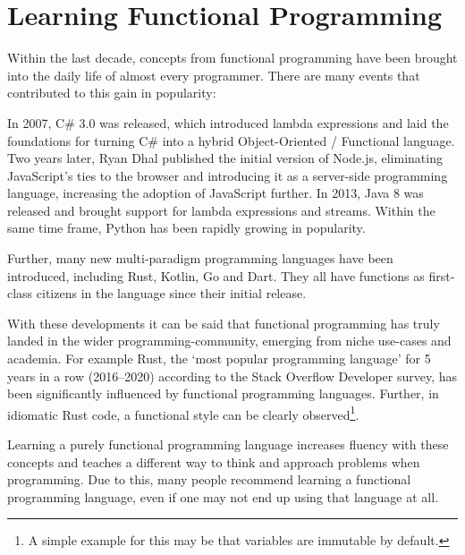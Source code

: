 
\section{Learning Functional Programming}

Within the last decade, concepts from functional programming have been brought into the daily life
of almost every programmer. There are many events that contributed to this gain in popularity:

In 2007, C\# 3.0 was released, which introduced lambda expressions and laid the foundations for
turning C\# into a hybrid Object-Oriented / Functional language\autocite{csharp-functional}.
Two years later, Ryan Dhal published the initial version of Node.js, eliminating JavaScript's
ties to the browser and introducing it as a server-side programming language, increasing the
adoption of JavaScript further.
In 2013, Java 8 was released and brought support for lambda expressions and streams.
Within the same time frame, Python has been rapidly growing in popularity\autocite{python-popularity}.

Further, many new multi-paradigm programming languages have been introduced,
including Rust, Kotlin, Go and Dart. They all have functions as first-class citizens in
the language since their initial release.

With these developments it can be said that functional programming has truly landed in the
wider programming-community, emerging from niche use-cases and academia.
For example Rust, the `most popular programming language' for 5 years in a row (2016--2020)
according to the Stack Overflow Developer survey\autocite{rust-loved}, has been significantly
influenced by functional programming languages\autocite{rust-functional}. Further, in idiomatic
Rust code, a functional style can be clearly observed\footnote{A simple example for this may be
that variables are immutable by default.}.

Learning a purely functional programming language increases fluency with these concepts and
teaches a different way to think and approach problems when programming. Due to this, many
people recommend learning a functional programming
language\autocite{blog1-funcprog}\autocite{blog2-funcprog}\autocite{blog3-funcprog}\autocite{blog4-funcprog},
even if one may not end up using that language at all\autocite{quora-funcprog}.

